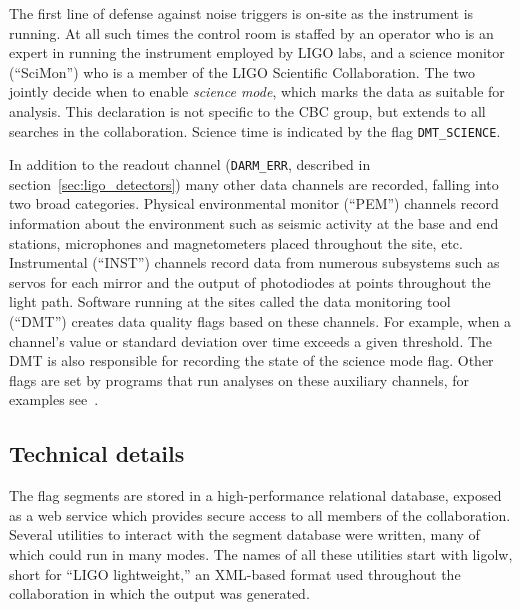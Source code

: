 The first line of defense against noise triggers is on-site as the
instrument is running.  At all such times the control room is staffed
by an operator who is an expert in running the instrument employed by
LIGO labs, and a science monitor (``SciMon'') who is a member of the
LIGO Scientific Collaboration.  The two jointly decide when to enable
\emph{science mode}, which marks the data as suitable for analysis.
This declaration is not specific to the CBC group, but extends to all
searches in the collaboration.  Science time is indicated by the flag
\texttt{DMT\_SCIENCE}.

In addition to the readout channel (\texttt{DARM\_ERR}, described in
section~\ref{sec:ligo_detectors}) many other data channels are
recorded, falling into two broad categories.  Physical environmental
monitor (``PEM'') channels record information about the environment
such as seismic activity at the base and end stations, microphones and
magnetometers placed throughout the site, etc.  Instrumental
(``INST'') channels record data from numerous subsystems such as
servos for each mirror and the output of photodiodes at points
throughout the light path.  Software running at the sites called the
data monitoring tool (``DMT'') creates data quality flags based on
these channels.  For example, when a channel's value or standard
deviation over time exceeds a given threshold.  The DMT is also
responsible for recording the state of the science mode flag.  Other
flags are set by programs that run analyses on these auxiliary
channels, for examples see~\cite{Isogai:2010}.



\iffalse
\subsection{Technical details}

The flag segments are stored in a high-performance relational
database, exposed as a web service which provides secure access to all
members of the collaboration.  Several utilities to interact with the
segment database were written, many of which could run in many modes.
The names of all these utilities start with ligolw, short for ``LIGO
lightweight,'' an XML-based format used throughout the collaboration
in which the output was generated.

